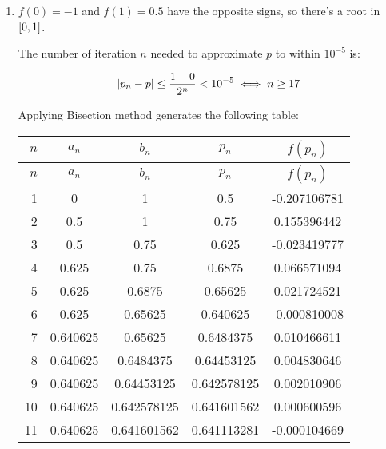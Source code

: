 \documentclass[../../../../Assignments.tex]{subfiles}
\begin{document}
\begin{solution}
    \begin{enumerate}[label = (\alph*)]
        \item \(f(0) = -1\) and \(f(1) = \num{0.5}\) have the opposite signs, so
            there's a root in \(\interval{0}{1}\).

            The number of iteration \(n\) needed to approximate \(p\) to within
            \(10^{-5}\) is:

            \[\abs{p_n - p} \leq \frac{1 - 0}{2^n} < 10^{-5} \iff n \geq 17\]

            Applying Bisection method generates the following table:

            \begin{longtable}{r S[table-format=1.9] S[table-format=1.9] S[table-format=1.9] S[table-format=-1.9]}
                \toprule
                \(n\)  &   {\(a_n\)}   &   {\(b_n\)}   &   {\(p_n\)}   &  {\(f(p_n)\)}  \\
                \midrule
                \endfirsthead
                \(n\)  &   {\(a_n\)}   &   {\(b_n\)}   &   {\(p_n\)}   &  {\(f(p_n)\)}  \\
                \midrule
                  &  0            &  1            &  0.5          &  -0.207106781  \\
                    2  &  0.5          &  1            &  0.75         &   0.155396442  \\
                    3  &  0.5          &  0.75         &  0.625        &  -0.023419777  \\
                    4  &  0.625        &  0.75         &  0.6875       &   0.066571094  \\
                    5  &  0.625        &  0.6875       &  0.65625      &   0.021724521  \\
                    6  &  0.625        &  0.65625      &  0.640625     &  -0.000810008  \\
                    7  &  0.640625     &  0.65625      &  0.6484375    &   0.010466611  \\
                    8  &  0.640625     &  0.6484375    &  0.64453125   &   0.004830646  \\
                    9  &  0.640625     &  0.64453125   &  0.642578125  &   0.002010906  \\
                   10  &  0.640625     &  0.642578125  &  0.641601562  &   0.000600596  \\
                   11  &  0.640625     &  0.641601562  &  0.641113281  &  -0.000104669  \\

\end{longtable}
\end{enumerate}
\end{solution}
\end{document}
